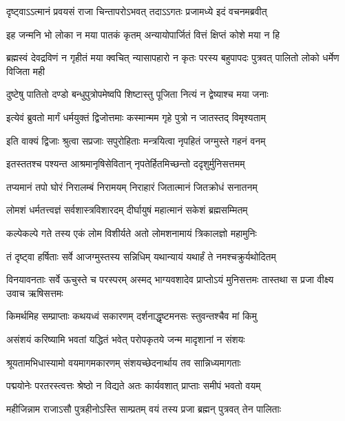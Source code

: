 \twolineshloka
{दृष्ट्वाऽऽत्मानं प्रवयसं राजा चिन्तापरोऽभवत्}
{तदाऽऽगतः प्रजामध्ये इदं वचनमब्रवीत्}%

\twolineshloka
{इह जन्मनि भो लोका न मया पातकं कृतम्}
{अन्यायोपार्जितं वित्तं क्षिप्तं कोशे मया न हि}%

\threelineshloka
{ब्रह्मस्वं देवद्रविणं न गृहीतं मया क्वचित्}
{न्यासापहारो न कृतः परस्य बहुपापदः}
{पुत्रवत् पालितो लोको धर्मेण विजिता मही}%

\twolineshloka
{दुष्टेषु पातितो दण्डो बन्धुपुत्रोपमेष्वपि}
{शिष्टास्तु पूजिता नित्यं न द्वेष्याश्च मया जनाः}%

\twolineshloka
{इत्येवं ब्रुवतो मार्गं धर्मयुक्तं द्विजोत्तमाः}
{कस्मान्मम गृहे पुत्रो न जातस्तद् विमृश्यताम्}%

\twolineshloka
{इति वाक्यं द्विजाः श्रुत्वा सप्रजाः सपुरोहिताः}
{मन्त्रयित्वा नृपहितं जग्मुस्ते गहनं वनम्}%

\twolineshloka
{इतस्ततश्च पश्यन्त आश्रमानृषिसेवितान्}
{नृपतेर्हितमिच्छन्तो ददृशुर्मुनिसत्तमम्}%

\twolineshloka
{तप्यमानं तपो घोरं निरालम्बं निरामयम्}
{निराहारं जितात्मानं जितक्रोधं सनातनम्}%

\twolineshloka
{लोमशं धर्मतत्त्वज्ञं सर्वशास्त्रविशारदम्}
{दीर्घायुषं महात्मानं सकेशं ब्रह्मसम्मितम्}%

\twolineshloka
{कल्पेकल्पे गते तस्य एकं लोम विशीर्यते}
{अतो लोमशनामायं त्रिकालज्ञो महामुनिः}%

\twolineshloka
{तं दृष्ट्वा हर्षिताः सर्वे आजग्मुस्तस्य सन्निधिम्}
{यथान्यायं यथार्हं ते नमश्चक्रुर्यथोदितम्}%

\threelineshloka
{विनयावनताः सर्वे ऊचुस्ते च परस्परम्}
{अस्मद् भाग्यवशादेव प्राप्तोऽयं मुनिसत्तमः}
{तास्तथा स प्रजा वीक्ष्य उवाच ऋषिसत्तमः}%


\twolineshloka
{किमर्थमिह सम्प्राप्ताः कथयध्वं सकारणम्}
{दर्शनाद्धृष्टमनसः स्तुवन्तश्चैव मां किमु}%

\twolineshloka
{असंशयं करिष्यामि भवतां यद्धितं भवेत्}
{परोपकृतये जन्म मादृशानां न संशयः}%


\twolineshloka
{श्रूयतामभिधास्यामो वयमागमकारणम्}
{संशयच्छेदनार्थाय तव सान्निध्यमागताः}%

\twolineshloka
{पद्मयोनेः परतरस्त्वत्तः श्रेष्ठो न विद्यते}
{अतः कार्यवशात् प्राप्ताः समीपं भवतो वयम्}%

\twolineshloka
{महीजिन्नाम राजाऽसौ पुत्रहीनोऽस्ति साम्प्रतम्}
{वयं तस्य प्रजा ब्रह्मन् पुत्रवत् तेन पालिताः}%

